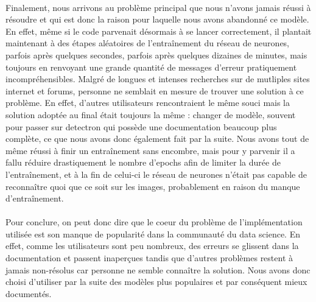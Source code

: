 \paragraph{} Finalement, nous arrivons au problème principal que nous n'avons jamais réussi à résoudre et qui est donc la raison pour laquelle nous avons abandonné ce modèle. En effet, même si le code parvenait désormais à se lancer correctement, il plantait maintenant à des étapes aléatoires de l'entraînement du réseau de neurones, parfois après quelques secondes, parfois après quelques dizaines de minutes, mais toujours en renvoyant une grande quantité de messages d'erreur pratiquement incompréhensibles. Malgré de longues et intenses recherches sur de mutliples sites internet et forums, personne ne semblait en mesure de trouver une solution à ce problème. En effet, d'autres utilisateurs rencontraient le même souci mais la solution adoptée au final était toujours la même : changer de modèle, souvent pour passer sur detectron qui possède une documentation beaucoup plus complète, ce que nous avons donc également fait par la suite. Nous avons tout de même réussi à finir un entraînement sans encombre, mais pour y parvenir il a fallu réduire drastiquement le nombre d'epochs afin de limiter la durée de l'entraînement, et à la fin de celui-ci le réseau de neurones n'était pas capable de reconnaître quoi que ce soit sur les images, probablement en raison du manque d'entraînement.

\paragraph{} Pour conclure, on peut donc dire que le coeur du problème de l'implémentation utilisée est son manque de popularité dans la communauté du data science. En effet, comme les utilisateurs sont peu nombreux, des erreurs se glissent dans la documentation et passent inaperçues tandis que d'autres problèmes restent à jamais non-résolus car personne ne semble connaître la solution. Nous avons donc choisi d'utiliser par la suite des modèles plus populaires et par conséquent mieux documentés. 


